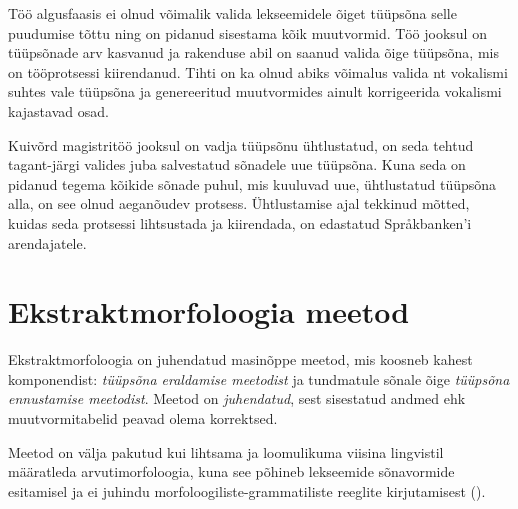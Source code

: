 \documentclass[12pt,a4paper]{article}
\begin{document}
Töö algusfaasis ei olnud võimalik valida lekseemidele õiget tüüpsõna selle puudumise tõttu ning on pidanud sisestama kõik muutvormid. Töö jooksul on tüüpsõnade arv kasvanud ja rakenduse abil on saanud valida õige tüüpsõna, mis on töö\-protsessi kiirendanud. Tihti on ka olnud abiks võimalus valida nt vokalismi suhtes vale tüüpsõna ja genereeritud muutvormides ainult korrigeerida vokalismi kajastavad osad.

Kuivõrd magistritöö jooksul on vadja tüüpsõnu ühtlustatud, on seda tehtud tagant-järgi valides juba salvestatud sõnadele uue tüüpsõna. Kuna seda on pidanud tegema kõikide sõnade puhul, mis kuuluvad uue, ühtlustatud tüüpsõna alla, on see olnud aega\-nõudev protsess. Ühtlustamise ajal tekkinud mõtted, kuidas seda protsessi lihtsustada ja kiirendada, on edastatud Språkbanken'i arendajatele.


\newpage
\section{Ekstraktmorfoloogia meetod}
\label{sec:ekstraktmorfoloogia-meetod}




Ekstraktmorfoloogia on juhendatud masinõppe meetod, mis koosneb kahest komponendist: \emph{tüüpsõna eraldamise meetodist} ja tundmatule sõnale õige \emph{tüüpsõna ennustamise meetodist}. Meetod on \textit{juhendatud}, sest sisestatud andmed ehk muutvormi\-tabelid peavad olema korrektsed.


Meetod on välja pakutud kui lihtsama ja loomulikuma viisina lingvistil määratleda arvutimorfoloogia, kuna see põhineb lekseemide sõnavormide esitamisel ja ei juhindu morfoloogiliste-grammatiliste reeglite kirjutamisest (\cite[14]{forsberg_what_2016}).
\end{document}
